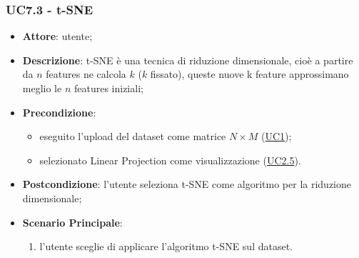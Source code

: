     \subsubsection{UC7.3 - t-SNE}
    \label{uc7.3}
    \begin{itemize}
    \item \textbf{Attore}: utente;
    \item \textbf{Descrizione}: t-SNE è una tecnica di riduzione dimensionale, cioè a partire da $n$ features ne calcola $k$ ($k$ fissato), queste nuove k feature approssimano meglio le $n$ features iniziali;
    \item \textbf{Precondizione}: 
    \begin{itemize}
        \item eseguito l'upload del dataset come matrice $N\times M$ (\hyperref[uc1]{UC1});
        \item selezionato Linear Projection come visualizzazione (\hyperref[uc2.5]{UC2.5}).
    \end{itemize}  
    \item \textbf{Postcondizione}: l'utente seleziona t-SNE come algoritmo per la riduzione dimensionale;
    \item \textbf{Scenario Principale}: 
    \begin{enumerate}
        \item l'utente sceglie di applicare l'algoritmo t-SNE sul dataset.
    \end{enumerate}
    \end{itemize}
    
    
